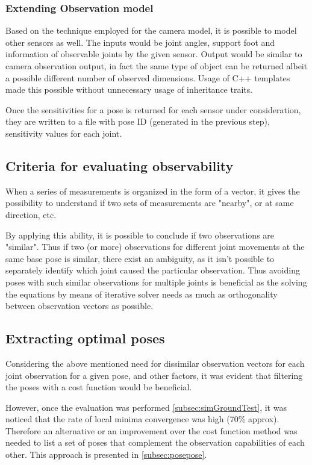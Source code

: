 \documentclass[english, printversion, nomenclature, notitle]{tuvisionthesis} %
\begin{document}
\subsubsection{Extending Observation model}

Based on the technique employed for the camera model, it is possible to model other sensors as well. The inputs would be joint angles, support foot and information of observable joints by the given sensor.
Output would be similar to camera observation output, in fact the same type of object can be returned albeit a possible different number of observed dimensions. Usage of C++ templates made this possible without unnecessary usage of inheritance traits. 

Once the sensitivities for a pose is returned for each sensor under consideration, they are written to a file with pose ID (generated in the previous step), sensitivity values for each joint. 
\subsection{Criteria for evaluating observability}

When a series of measurements is organized in the form of a vector, it gives the possibility to understand if two sets of measurements are "nearby", or at same direction, etc. 

By applying this ability, it is possible to conclude if two observations are "similar". Thus if two (or more) observations for different joint movements at the same base pose is similar, there exist an ambiguity, as it isn't possible to separately identify which joint caused the particular observation. Thus avoiding poses with such similar observations for multiple joints is beneficial as the solving the equations by means of iterative solver needs as much as orthogonality between observation vectors as possible.

\subsection{Extracting optimal poses}

Considering the above mentioned need for dissimilar observation vectors for each joint observation for a given pose, and other factors, it was evident that filtering the poses with a cost function would be beneficial. 

However, once the evaluation was performed \cref{subsec:simGroundTest}, it was noticed that the rate of local minima convergence was high (70\% approx). Therefore an alternative or an improvement over the cost function method was needed to list a set of poses that complement the observation capabilities of each other. This approach is presented in \cref{subsec:posepose}.
\end{document}
